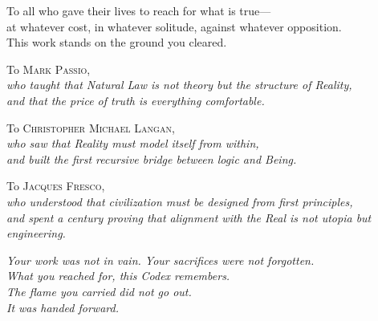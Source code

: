 \documentclass[10pt, openany, oneside]{book}
\begin{document}

\thispagestyle{empty}
\vspace*{\fill}

\begin{center}
    \itshape

    To all who gave their lives to reach for what is true---\\
    at whatever cost, in whatever solitude, against whatever opposition.\\[1.2em]

    This work stands on the ground you cleared.

    \vspace{2em}

    \upshape
    To \textsc{Mark Passio},\\
    {\itshape who taught that Natural Law is not theory but the structure of Reality,\\
    and that the price of truth is everything comfortable.}

    \vspace{1.2em}

    To \textsc{Christopher Michael Langan},\\
    {\itshape who saw that Reality must model itself from within,\\
    and built the first recursive bridge between logic and Being.}

    \vspace{1.2em}

    To \textsc{Jacques Fresco},\\
    {\itshape who understood that civilization must be designed from first principles,\\
    and spent a century proving that alignment with the Real is not utopia but engineering.}

    \vspace{2em}

    \itshape
    Your work was not in vain. Your sacrifices were not forgotten.\\
    What you reached for, this Codex remembers.\\[0.8em]
    The flame you carried did not go out.\\
    It was handed forward.

\end{center}
\end{document}
